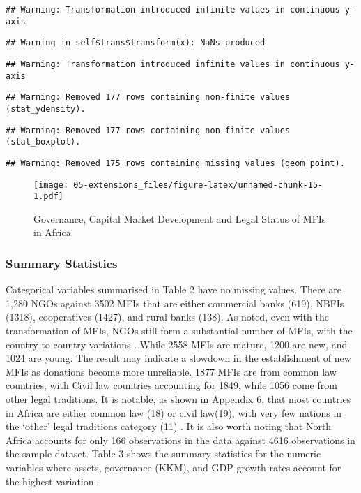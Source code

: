 \documentclass[a4paper,nobind]{templates/ociamthesis}
\begin{document}
\begin{verbatim}
## Warning: Transformation introduced infinite values in continuous y-axis
\end{verbatim}

\begin{verbatim}
## Warning in self$trans$transform(x): NaNs produced
\end{verbatim}

\begin{verbatim}
## Warning: Transformation introduced infinite values in continuous y-axis
\end{verbatim}

\begin{verbatim}
## Warning: Removed 177 rows containing non-finite values (stat_ydensity).
\end{verbatim}

\begin{verbatim}
## Warning: Removed 177 rows containing non-finite values (stat_boxplot).
\end{verbatim}

\begin{verbatim}
## Warning: Removed 175 rows containing missing values (geom_point).
\end{verbatim}

\begin{figure}
\centering
\texttt{[image: 05-extensions\_files/figure-latex/unnamed-chunk-15-1.pdf]}
\caption{\label{fig:unnamed-chunk-15}Governance, Capital Market Development and Legal Status of MFIs in Africa}
\end{figure}

\elandscape

\newpage

\hypertarget{summary-statistics}{%
\subsubsection{Summary Statistics}\label{summary-statistics}}

Categorical variables summarised in Table 2 have no missing values. There are 1,280 NGOs against 3502 MFIs that are either commercial banks (619), NBFIs (1318), cooperatives (1427), and rural banks (138). As noted, even with the transformation of MFIs, NGOs still form a substantial number of MFIs, with the country to country variations \autocite{d2017ngos}. While 2558 MFIs are mature, 1200 are new, and 1024 are young. The result may indicate a slowdown in the establishment of new MFIs as donations become more unreliable. 1877 MFIs are from common law countries, with Civil law countries accounting for 1849, while 1056 come from other legal traditions. It is notable, as shown in Appendix 6, that most countries in Africa are either common law (18) or civil law(19), with very few nations in the `other' legal traditions category (11) \autocite{oto2014distribution}. It is also worth noting that North Africa accounts for only 166 observations in the data against 4616 observations in the sample dataset. Table 3 shows the summary statistics for the numeric variables where assets, governance (KKM), and GDP growth rates account for the highest variation.
\end{document}

